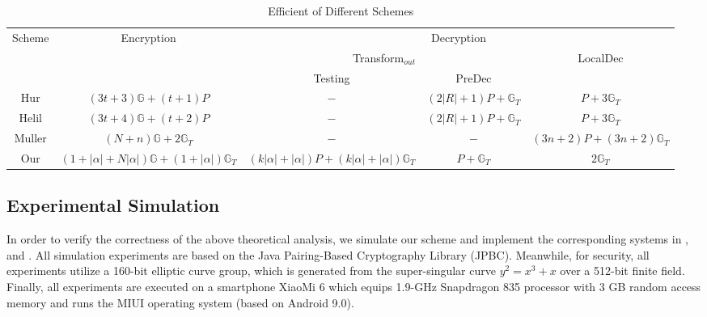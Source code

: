 \documentclass[smallextended]{svjour3}       %
\begin{document}
\begin{table}[htbp]
	\centering
	\caption{Efficient of Different Schemes}
	\resizebox{\textwidth}{10mm}
	{
		\begin{tabular}{|c|c|c|c|c|}
			\hline  
			\multirow{3}{*}{Scheme} & \multirow{3}{*}{Encryption} & \multicolumn{3}{c|}{Decryption} \\			
		\cline{3-5}          &       & \multicolumn{2}{c|}{Transform$_{out}$} & \multirow{2}{*}{LocalDec} \\
		\cline{3-4}          &       & Testing & PreDec &  \\
		\hline
		Hur     &$(3t+3)\mathbb{G}+(t+1)P$     & $-$     & $(2|R|+1)P+\mathbb{G}_T$     & $P+3\mathbb{G}_T$ \\ \hline
		Helil     &$(3t+4)\mathbb{G}+(t+2)P$     & $-$     & $(2|R|+1)P+\mathbb{G}_T$     & $P+3\mathbb{G}_T$ \\ \hline
		Muller  &  $(N+n)\mathbb{G} + 2\mathbb{G}_T$ & $-$ & $-$ & $(3n+2)P+(3n+2)\mathbb{G}_T$ \\ \hline
		Our     & $(1+|\alpha|+N|\alpha|)\mathbb{G}+(1+|\alpha|)\mathbb{G}_T$    & $(k|\alpha|+|\alpha|)P+(k|\alpha|+|\alpha|)\mathbb{G}_T$     & $P+\mathbb{G}_T$     & $2\mathbb{G}_T$ \\ \hline
		\end{tabular}
	}
	\label{efficiencyTable}
  \end{table}


\subsection{Experimental Simulation}
In order to verify the correctness of the above theoretical analysis, we simulate our scheme and implement the corresponding systems in \cite{hur2013attribute}, \cite{helil2017cp} and \cite{muller2011hiding}.
All simulation experiments are based on the Java Pairing-Based Cryptography Library (JPBC).
Meanwhile, for security, all experiments utilize a 160-bit elliptic curve group, which is generated from the super-singular curve $y^2 = x^3 + x$ over a 512-bit finite field.
Finally, all experiments are executed on a smartphone XiaoMi 6 which equips 1.9-GHz Snapdragon 835 processor with 3 GB random access memory and runs the MIUI operating system (based on Android 9.0).
\end{document}
